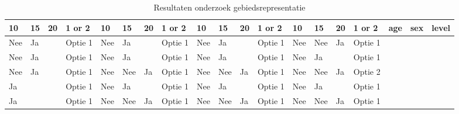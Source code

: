 \documentclass[twoside,openright]{uva-bachelor-thesis}
\begin{document}
\begin{table}
	\centering
	\caption{Resultaten onderzoek gebiedsrepresentatie}
	\begin{tabular}{|l|l|l|l|l|l|l|l|l|l|l|l|l|l|l|l|l|l|l|}
		\hline
		{\bf 10} & {\bf 15} & {\bf 20} & {\bf 1 or 2} & {\bf 10} & {\bf 15} & {\bf 20} & {\bf 1 or 2} & {\bf 10} & {\bf 15} & {\bf 20} & {\bf 1 or 2} & {\bf 10} & {\bf 15} & {\bf 20} & {\bf 1 or 2} & {\bf age} & {\bf sex} & {\bf level}   \\  \hline
		Nee      & Ja       &          & Optie 1                             & Nee      & Ja       &          & Optie 1                             & Nee      & Ja       &          & Optie 1                             & Nee      & Nee      & Ja       & Optie 1                             &                    &                    &                                                          \\  \hline
		Nee      & Ja       &          & Optie 1                             & Nee      & Ja       &          & Optie 1                             & Nee      & Ja       &          & Optie 1                             & Nee      & Ja       &          & Optie 1                             &                    &                    &                                                          \\  \hline
		Nee      & Ja       &          & Optie 1                             & Nee      & Nee      & Ja       & Optie 1                             & Nee      & Nee      & Ja       & Optie 1                             & Nee      & Nee      & Ja       & Optie 2                             &                    &                    &                                                         \\  \hline
		Ja       &          &          & Optie 1                             & Nee      & Ja       &          & Optie 1                             & Nee      & Ja       &          & Optie 1                             & Nee      & Ja       &          & Optie 1                             &                    &                    &                                                          \\  \hline
		Ja       &          &          & Optie 1                             & Nee      & Nee      & Ja       & Optie 1                             & Nee      & Nee      & Ja       & Optie 1                             & Nee      & Nee      & Ja       & Optie 1                             &                    &                    &                                                          \\  \hline

\end{tabular}
\end{table}
\end{document}
